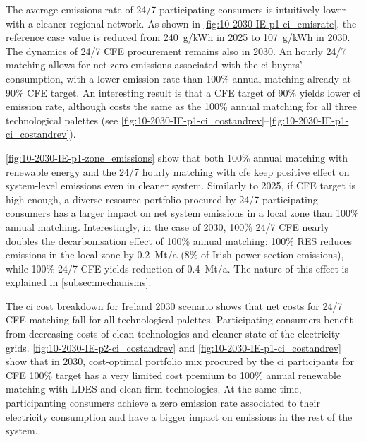 The average emissions rate of 24/7 participating consumers is intuitively lower with a cleaner regional network. 
As shown in \cref{fig:10-2030-IE-p1-ci_emisrate}, the reference case value is reduced from 240~g\co/kWh in 2025 to 107~g\co/kWh in 2030.
The dynamics of 24/7 CFE procurement remains also in 2030. An hourly 24/7 matching allows for net-zero emissions associated with the \gls{ci} buyers' consumption, with a lower emission rate than 100\% annual matching already at 90\% CFE target.
An interesting result is that a CFE target of 90\% yields lower \gls{ci} emission rate, although costs the same as the 100\% annual matching for all three technological palettes (see \cref{fig:10-2030-IE-p1-ci_costandrev}--\cref{fig:10-2030-IE-p1-ci_costandrev}). 

\cref{fig:10-2030-IE-p1-zone_emissions} show that both 100\% annual matching with renewable energy and the 24/7 hourly matching with \gls{cfe} keep positive effect on system-level emissions even in cleaner system. 
Similarly to 2025, if CFE target is high enough, a diverse resource portfolio procured by 24/7 participating consumers has a larger impact on net system emissions in a local zone than 100\% annual matching.
Interestingly, in the case of 2030, 100\% 24/7 CFE nearly doubles the decarbonisation effect of 100\% annual matching: 100\% RES reduces emissions in the local zone by 0.2~Mt\co/a (8\% of Irish power section emissions), while 100\% 24/7 CFE yields reduction of 0.4~Mt\co/a. The nature of this effect is explained in \cref{subsec:mechanisms}.

The \gls{ci} cost breakdown for Ireland 2030 scenario shows that net costs for 24/7 CFE matching fall for all technological palettes. Participating consumers benefit from decreasing costs of clean technologies and cleaner state of the electricity grids.
\cref{fig:10-2030-IE-p2-ci_costandrev} and \cref{fig:10-2030-IE-p1-ci_costandrev} show that in 2030, cost-optimal portfolio mix procured by the \gls{ci} participants for CFE 100\% target has a very limited cost premium to 100\% annual renewable matching with LDES and clean firm technologies. 
At the same time, participanting consumers achieve a zero emission rate associated to their electricity consumption and have a bigger impact on \co emissions in the rest of the system.

